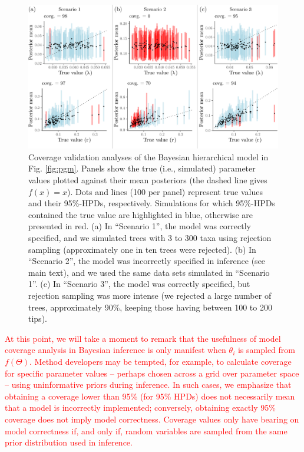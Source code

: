\documentclass[oneside]{article}
\begin{document}
\begin{figure}
  \includegraphics[width=\textwidth]{../figures/graphical_model_coverage.pdf}
  \caption{
    Coverage validation analyses of the Bayesian hierarchical model in Fig. \ref{fig:pgm}.
    Panels show the true (i.e., simulated) parameter values plotted against their mean posteriors (the dashed line gives $f(x) = x$).
    Dots and lines (100 per panel) represent true values and their 95\%-HPDs, respectively.
    Simulations for which 95\%-HPDs contained the true value are highlighted in blue, otherwise are presented in red.
    (a) In ``Scenario 1'', the model was correctly specified, and we simulated trees with 3 to 300 taxa using rejection sampling (approximately one in ten trees were rejected).
    (b) In ``Scenario 2'', the model was incorrectly specified in inference (see main text), and we used the same data sets simulated in ``Scenario 1''.
    (c) In ``Scenario 3'', the model was correctly specified, but rejection sampling was more intense (we rejected a large number of trees, approximately 90\%, keeping those having between 100 to 200 tips).
  }
  \label{fig:yulecalval}
\end{figure}

\textcolor{red}{At this point, we will take a moment to remark that the usefulness of model coverage analysis in Bayesian inference is only manifest when $\theta_i$ is sampled from $f(\Theta)$.
Method developers may be tempted, for example, to calculate coverage for specific parameter values -- perhaps chosen across a grid over parameter space -- using uninformative priors during inference.
In such cases, we emphasize that obtaining a coverage lower than 95\% (for 95\% HPDs) does not necessarily mean that a model is incorrectly implemented; conversely, obtaining exactly 95\% coverage does not imply model correctness.
Coverage values only have bearing on model correctness if, and only if, random variables are sampled from the same prior distribution used in inference. 
}
\end{document}
